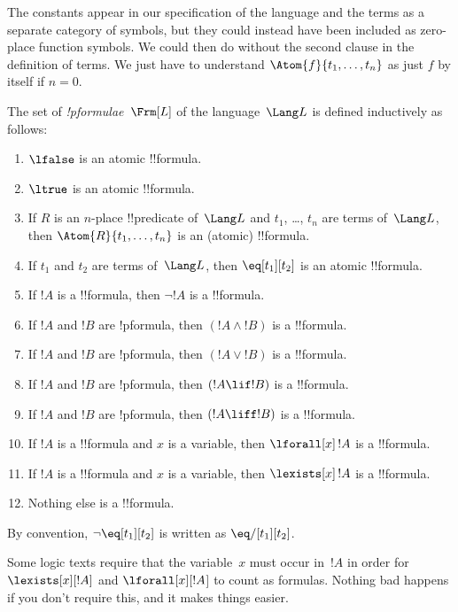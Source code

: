 \documentclass[../../include/open-logic-section]{subfiles}
\begin{document}
\begin{explain}
The constants appear in our specification of the language and the
terms as a separate category of symbols, but they could instead have
been included as zero-place function symbols.  We could then do
without the second clause in the definition of terms. We just have to
understand $\Atom{f}{t_1, \ldots, t_n}$ as just $f$ by itself if $n =
0$.
\end{explain}

\begin{defn}[Formula]
The set of \emph{!p{formulae}}~$\Frm[L]$ of the language~$\Lang L$
is defined inductively as follows:
\begin{enumerate}
\item $\lfalse$ is an atomic !!{formula}.
\item $\ltrue$ is an atomic !!{formula}.
\item If $R$ is an $n$-place !!{predicate} of~$\Lang L$ and $t_1$, \dots,
  $t_n$ are terms of~$\Lang L$, then $\Atom{R}{t_1,\ldots, t_n}$ is an
  (atomic) !!{formula}.
\item If $t_1$ and $t_2$ are terms of~$\Lang L$, then $\eq[t_1][t_2]$
  is an atomic !!{formula}.
\item If $!A$ is a !!{formula}, then $\lnot !A$ is a !!{formula}.
\item If $!A$ and $!B$ are !p{formula}, then $(!A \land !B)$ is a !!{formula}.
\item If $!A$ and $!B$ are !p{formula}, then $(!A \lor !B)$ is a !!{formula}.
\item If $!A$ and $!B$ are !p{formula}, then $(!A \lif !B)$ is a !!{formula}.
\item If $!A$ and $!B$ are !p{formula}, then $(!A \liff !B)$ is a !!{formula}.
\item If $!A$ is a !!{formula} and $x$ is a variable, then $\lforall[x]\,
  !A$ is a !!{formula}.
\item If $!A$ is a !!{formula} and $x$ is a variable, then $\lexists[x]\,
  !A$ is a !!{formula}.
\item Nothing else is a !!{formula}.
\end{enumerate}
\end{defn}

\begin{explain}
By convention, $\lnot \eq[t_1][t_2]$ is written as $\eq/[t_1][t_2]$.
\end{explain}

\begin{intro}
Some logic texts require that the variable~$x$ must occur in~$!A$ in
order for $\lexists[x][!A]$ and $\lforall[x][!A$] to count as
formulas.  Nothing bad happens if you don't require this, and it makes
things easier.
\end{intro}
\end{document}
